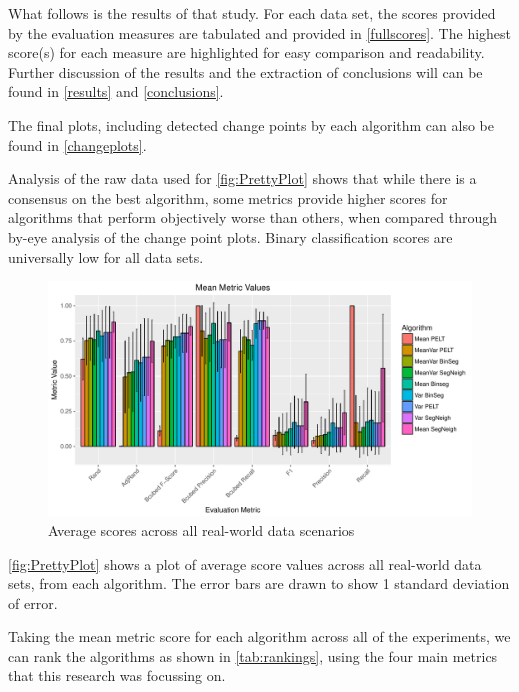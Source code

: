 \documentclass[../main.tex]{subfiles}
\begin{document}
What follows is the results of that study. For each data set, the scores provided by the evaluation measures are tabulated and provided in \autoref{fullscores}. The highest score(s) for each measure are highlighted for easy comparison and readability. Further discussion of the results and the extraction of conclusions will can be found in \autoref{results} and \autoref{conclusions}.

The final plots, including detected change points by each algorithm can also be found in \autoref{changeplots}.

Analysis of the raw data used for \autoref{fig:PrettyPlot} shows that while there is a consensus on the best algorithm, some metrics provide higher scores for algorithms that perform objectively worse than others, when compared through by-eye analysis of the change point plots. Binary classification scores are universally low for all data sets.

\begin{figure}[h]
    \includegraphics[width=\textwidth]{figures/PrettyPlot2}
    \caption{Average scores across all real-world data scenarios}
    \label{fig:PrettyPlot}
\end{figure}

\autoref{fig:PrettyPlot} shows a plot of average score values across all real-world data sets, from each algorithm. The error bars are drawn to show 1 standard deviation of error.

Taking the mean metric score for each algorithm across all of the experiments, we can rank the algorithms as shown in \autoref{tab:rankings}, using the four main metrics that this research was focussing on.
\end{document}

